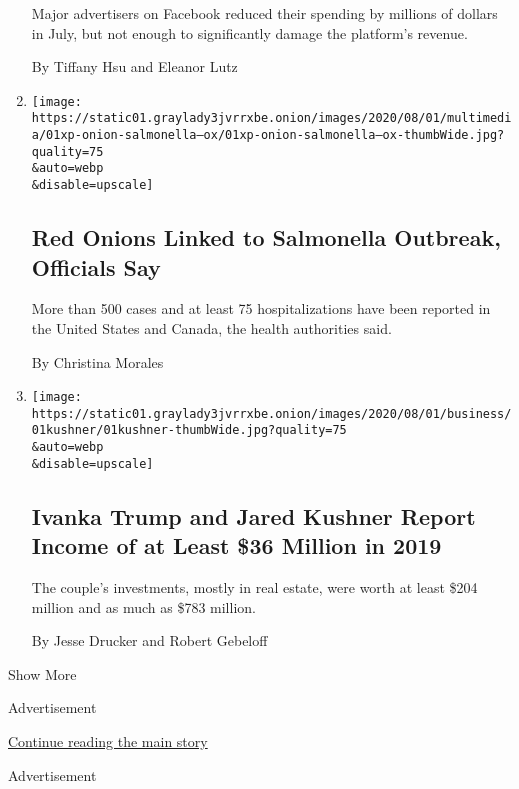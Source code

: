 \begin{enumerate}
  Major advertisers on Facebook reduced their spending by millions of
  dollars in July, but not enough to significantly damage the platform's
  revenue.

  By Tiffany Hsu and Eleanor Lutz
\item
  \href{/2020/08/01/us/salmonella-outbreak-onions.html}{}

  \texttt{[image: https://static01.graylady3jvrrxbe.onion/images/2020/08/01/multimedia/01xp-onion-salmonella--ox/01xp-onion-salmonella--ox-thumbWide.jpg?quality=75\\\&auto=webp\\\&disable=upscale]}

  \hypertarget{red-onions-linked-to-salmonella-outbreak-officials-say}{%
  \subsection{Red Onions Linked to Salmonella Outbreak, Officials
  Say}\label{red-onions-linked-to-salmonella-outbreak-officials-say}}

  More than 500 cases and at least 75 hospitalizations have been
  reported in the United States and Canada, the health authorities said.

  By Christina Morales
\item
  \href{/2020/08/01/business/ivanka-trump-jared-kushner-financial-disclosure.html}{}

  \texttt{[image: https://static01.graylady3jvrrxbe.onion/images/2020/08/01/business/01kushner/01kushner-thumbWide.jpg?quality=75\\\&auto=webp\\\&disable=upscale]}

  \hypertarget{ivanka-trump-and-jared-kushner-report-income-of-at-least-36-million-in-2019}{%
  \subsection{Ivanka Trump and Jared Kushner Report Income of at Least
  \$36 Million in
  2019}\label{ivanka-trump-and-jared-kushner-report-income-of-at-least-36-million-in-2019}}

  The couple's investments, mostly in real estate, were worth at least
  \$204 million and as much as \$783 million.

  By Jesse Drucker and Robert Gebeloff
\end{enumerate}

Show More

Advertisement

\protect\hyperlink{after-mid2}{Continue reading the main story}

Advertisement

